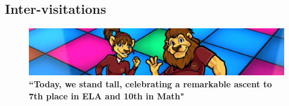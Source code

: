 \documentclass[11pt, letterpaper]{article}
\begin{document}
\subsection{Inter-visitations}

\begin{figure}[H]
  \centering
\includegraphics[width=1\linewidth]{5.png}
\caption{\textbf{“Today, we stand tall, celebrating a remarkable ascent to 7th place in ELA and 10th in Math"}}
  \label{fig:school success}
\end{figure}  
\end{document}
